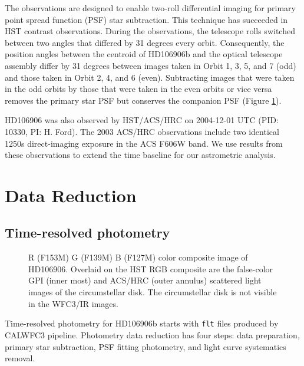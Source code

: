 \documentclass[twocolumn]{aastex62}
\begin{document}
The observations are designed to enable two-roll differential imaging for primary point spread function (PSF) star subtraction.  This technique has succeeded in HST contrast observations\citep{Zhou2016,Zhou2019}. During the observations, the telescope rolls switched between two angles that differed by 31 degrees every orbit.  Consequently, the position angles between the centroid of HD106906b and the optical telescope assembly differ by 31 degrees between images taken in Orbit 1, 3, 5, and 7 (odd) and those taken in Orbit 2, 4, and 6 (even). Subtracting images that were taken in the odd orbits by those that were taken in the even orbits or vice versa removes the primary star PSF but conserves the companion PSF (Figure \ref{fig:2rdi}).  

HD106906 was also observed by HST/ACS/HRC on 2004-12-01 UTC (PID: 10330, PI: H. Ford). The 2003 ACS/HRC observations include two identical 1250s direct-imaging exposure in the ACS F606W  band. We use results  from these observations \citep{Bailey2013,Kalas2015} to extend the time baseline for our astrometric analysis.

\section{Data Reduction}

\subsection{Time-resolved photometry}
\begin{figure}
  \centering
  \caption{R (F153M) G (F139M) B (F127M) color composite image of HD106906. Overlaid on the HST RGB composite are the false-color GPI (inner most) and ACS/HRC (outer annulus) scattered light images \citep{Kalas2015} of the circumstellar disk. The circumstellar disk is not visible in the WFC3/IR images.}
  \label{fig:2rdi}
\end{figure}

Time-resolved photometry for HD106906b starts with \texttt{flt} files produced by CALWFC3 pipeline. Photometry data reduction has four steps: data preparation, primary star subtraction, PSF fitting photometry, and light curve systematics removal.
\end{document}
